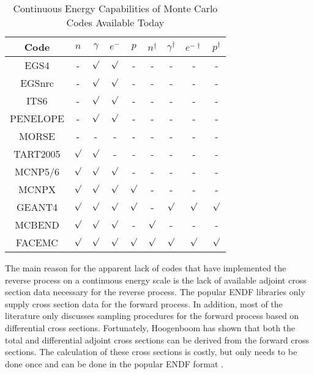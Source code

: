 \begin{table}[ht]
\label{table:monte_carlo_codes_today}
  \caption{Continuous Energy Capabilities of Monte Carlo Codes Available Today}
  \centering
  \begin{tabular}{c c c c c c c c c}
    \hline\hline
    Code & $n$ & $\gamma$ & $e^-$ & $p$ & $n^{\dagger}$ & $\gamma^{\dagger}$ & $e^{-\dagger}$ & $p^{\dagger}$ \\ [0.5ex]
    \hline
    EGS4 & - & $\surd$ & $\surd$ & - & - & - & - & - \\
    EGSnrc & - & $\surd$ & $\surd$ & - & - & - & - & - \\
    ITS6 & - & $\surd$ & $\surd$ & - & - & - & - & - \\
    PENELOPE & - & $\surd$ & $\surd$ & - & - & - & - & - \\
    MORSE & - & - & - & - & - & - & - & - \\
    TART2005 & $\surd$ & $\surd$ & - & - & - & - & - & - \\
    MCNP5/6 & $\surd$ & $\surd$ & $\surd$ & - & - & - & - & - \\
    MCNPX & $\surd$ & $\surd$ & $\surd$ & $\surd$ & - & - & - & - \\
    GEANT4 & $\surd$ & $\surd$ & $\surd$ & $\surd$ & - & $\surd$ & $\surd$ & $\surd$ \\
    MCBEND & $\surd$ & $\surd$ & $\surd$ & - & $\surd$ & - & - & - \\ [1ex]
    \hline
    FACEMC & $\surd$ & $\surd$ & $\surd$ & $\surd$ & $\surd$ & $\surd$ & $\surd$ & $\surd$ \\ [1ex]
    \hline
  \end{tabular}
  \label{table:mccodes}
\end{table}

The main reason for the apparent lack of 
codes that have implemented the reverse process on a continuous energy scale is
the lack of available adjoint cross section data necessary for the reverse 
process. The popular ENDF libraries only supply cross section data for the 
forward process. In addition, most of the literature only discusses sampling 
procedures for the forward process based on differential cross sections. 
Fortunately, Hoogenboom has shown that both the total and 
differential adjoint cross sections can be derived from the forward cross 
sections. The calculation of these cross sections is costly, but only needs to 
be done once and can be done in the popular ENDF format
\citep{hoogenboom_adjoint_1977}. 

